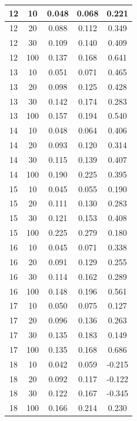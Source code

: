 \begin{longtable}{ |c|c|c|c|c| }
            12 & 10 & 0.048 & 0.068 & 0.221 \\ \hline
            12 & 20 & 0.088 & 0.112 & 0.349 \\ \hline
            12 & 30 & 0.109 & 0.140 & 0.409 \\ \hline
            12 & 100 & 0.137 & 0.168 & 0.641 \\ \hline
            13 & 10 & 0.051 & 0.071 & 0.465 \\ \hline
            13 & 20 & 0.098 & 0.125 & 0.428 \\ \hline
            13 & 30 & 0.142 & 0.174 & 0.283 \\ \hline
            13 & 100 & 0.157 & 0.194 & 0.540 \\ \hline
            14 & 10 & 0.048 & 0.064 & 0.406 \\ \hline
            14 & 20 & 0.093 & 0.120 & 0.314 \\ \hline
            14 & 30 & 0.115 & 0.139 & 0.407 \\ \hline
            14 & 100 & 0.190 & 0.225 & 0.395 \\ \hline
            15 & 10 & 0.045 & 0.055 & 0.190 \\ \hline
            15 & 20 & 0.111 & 0.130 & 0.283 \\ \hline
            15 & 30 & 0.121 & 0.153 & 0.408 \\ \hline
            15 & 100 & 0.225 & 0.279 & 0.180 \\ \hline
            16 & 10 & 0.045 & 0.071 & 0.338 \\ \hline
            16 & 20 & 0.091 & 0.129 & 0.255 \\ \hline
            16 & 30 & 0.114 & 0.162 & 0.289 \\ \hline
            16 & 100 & 0.148 & 0.196 & 0.561 \\ \hline
            17 & 10 & 0.050 & 0.075 & 0.127 \\ \hline
            17 & 20 & 0.096 & 0.136 & 0.263 \\ \hline
            17 & 30 & 0.135 & 0.183 & 0.149 \\ \hline
            17 & 100 & 0.135 & 0.168 & 0.686 \\ \hline
            18 & 10 & 0.042 & 0.059 & -0.215 \\ \hline
            18 & 20 & 0.092 & 0.117 & -0.122 \\ \hline
            18 & 30 & 0.122 & 0.167 & -0.345 \\ \hline
            18 & 100 & 0.166 & 0.214 & 0.230 \\ \hline

\end{longtable}
